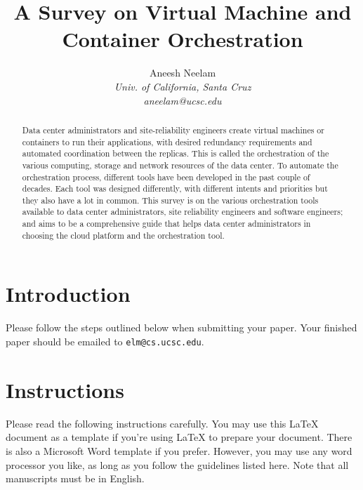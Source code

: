 \documentclass[10pt,twocolumn]{article}
\newcommand{\latex}{\LaTeX\xspace}
\begin{document}
\title{A Survey on Virtual Machine and Container Orchestration}

\author{
Aneesh Neelam \\
\textit{Univ. of California, Santa Cruz} \\
\textit{aneelam@ucsc.edu}
}

\maketitle
\thispagestyle{empty}

\begin{abstract}

  Data center administrators and site-reliability engineers create virtual machines or containers to run their applications, with desired redundancy requirements and automated coordination between the replicas.
  This is called the orchestration of the various computing, storage and network resources of the data center.
  To automate the orchestration process, different tools have been developed in the past couple of decades.
  Each tool was designed differently, with different intents and priorities but they also have a lot in common.
  This survey is on the various orchestration tools available to data center administrators, site reliability engineers and software engineers;
  and aims to be a comprehensive guide that helps data center administrators in choosing the cloud platform and the orchestration tool.

\end{abstract}

\section{Introduction}

Please follow the steps outlined below when submitting your paper.  Your
finished paper should be emailed to \verb+elm@cs.ucsc.edu+.

\section{Instructions}

Please read the following instructions carefully.  You may use this
\latex document as a template if you're using \latex to prepare your
document.  There is also a Microsoft Word template if you prefer.
However, you may use any word processor you like, as long as you
follow the guidelines listed here.  Note that all manuscripts must be
in English.
\end{document}
